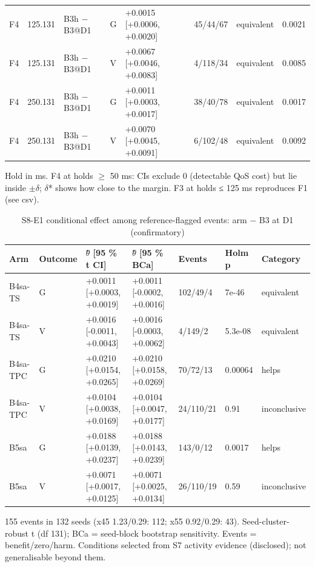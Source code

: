 \begin{table}[t]
\begin{tabular}{llllllll}
F4 & 125.131 & B3h $-$ B3@D1 & G & +0.0015 [+0.0006, +0.0020] & 45/44/67 & equivalent & 0.0021 \\
F4 & 125.131 & B3h $-$ B3@D1 & V & +0.0067 [+0.0046, +0.0083] & 4/118/34 & equivalent & 0.0085 \\
F4 & 250.131 & B3h $-$ B3@D1 & G & +0.0011 [+0.0003, +0.0017] & 38/40/78 & equivalent & 0.0017 \\
F4 & 250.131 & B3h $-$ B3@D1 & V & +0.0070 [+0.0045, +0.0091] & 6/102/48 & equivalent & 0.0092 \\
\bottomrule\end{tabular}
\par\smallskip\parbox{\linewidth}{\scriptsize Hold in ms. F4 at holds $\ge$ 50 ms: CIs exclude 0 (detectable QoS cost) but lie inside $\pm$$\delta$; $\delta$* shows how close to the margin. F3 at holds ≤ 125 ms reproduces F1 (see csv).}\end{table}

\begin{table}[t]\centering\caption{S8-E1 conditional effect among reference-flagged events: arm $-$ B3 at D1 (confirmatory)}\label{tab:t4}\footnotesize
\begin{tabular}{lllllll}\toprule
Arm & Outcome & $\theta$̂ [95 \% t CI] & $\theta$̂ [95 \% BCa] & Events & Holm p & Category \\\midrule
B4sa-TS & G & +0.0011 [+0.0003, +0.0019] & +0.0011 [-0.0002, +0.0016] & 102/49/4 & 7e-46 & equivalent \\
B4sa-TS & V & +0.0016 [-0.0011, +0.0043] & +0.0016 [-0.0003, +0.0062] & 4/149/2 & 5.3e-08 & equivalent \\
B4sa-TPC & G & +0.0210 [+0.0154, +0.0265] & +0.0210 [+0.0158, +0.0269] & 70/72/13 & 0.00064 & helps \\
B4sa-TPC & V & +0.0104 [+0.0038, +0.0169] & +0.0104 [+0.0047, +0.0177] & 24/110/21 & 0.91 & inconclusive \\
B5sa & G & +0.0188 [+0.0139, +0.0237] & +0.0188 [+0.0143, +0.0239] & 143/0/12 & 0.0017 & helps \\
B5sa & V & +0.0071 [+0.0017, +0.0125] & +0.0071 [+0.0025, +0.0134] & 26/110/19 & 0.59 & inconclusive \\
\bottomrule\end{tabular}
\par\smallskip\parbox{\linewidth}{\scriptsize 155 events in 132 seeds (x45 1.23/0.29: 112; x55 0.92/0.29: 43). Seed-cluster-robust t (df 131); BCa = seed-block bootstrap sensitivity. Events = benefit/zero/harm. Conditions selected from S7 activity evidence (disclosed); not generalisable beyond them.}\end{table}


